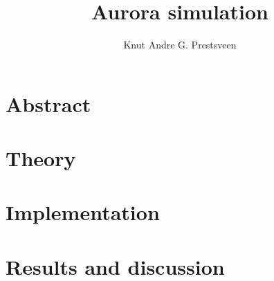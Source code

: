 \documentclass{article}
\title{Aurora simulation}
\author{Knut Andre G. Prestsveen}
\begin{document}
\maketitle
\section{Abstract}
\section{Theory}
\section{Implementation}
\section{Results and discussion}
\end{document}
